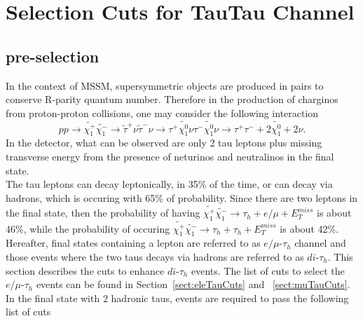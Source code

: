 \section{Selection Cuts for TauTau Channel}
\label{sect:tauTauCuts}
\subsection{pre-selection}
In the context of MSSM, supersymmetric objects are produced in pairs to conserve R-parity quantum number. Therefore in the production of charginos from proton-proton collisions, one may consider the following interaction $$pp\rightarrow\tilde{\chi_{1}^{+}}\tilde{\chi_{1}^{-}}\rightarrow\tilde{\tau}^{+}\nu \tilde{\tau}^{-}\nu\rightarrow\tau^{+}\tilde{\chi_{1}^{0}}\nu\tau^{-}\tilde{\chi_{1}^{0}}\nu\rightarrow\tau^{+}\tau^{-} + 2\tilde{\chi_{1}^{0}} + 2\nu.$$ In the detector, what can be observed are only 2 tau leptons plus missing transverse energy from the presence of neturinos and neutralinos in the final state.\\
The tau leptons can decay leptonically, in 35\% of the time, or can decay via hadrons, which is occuring with 65\% of probability. Since there are two leptons in the final state, then the probability of having $\tilde{\chi_{1}^{+}}\tilde{\chi_{1}^{-}} \rightarrow \tau_h+e/\mu+E_{T}^{miss}$ is about 46\%, while the probability of occuring $\tilde{\chi_{1}^{+}}\tilde{\chi_{1}^{-}} \rightarrow \tau_h+\tau_h+E_{T}^{miss}$ is about 42\%. Hereafter, final states containing a lepton are referred to as $e/\mu\text{-}\tau_h$ channel and those events where the two taus decays via hadrons are referred to as $di\text{-}\tau_h$. This section describes the cuts to enhance $di\text{-}\tau_h$ events. The list of cuts to select the $e/\mu\text{-}\tau_h$ events can be found in Section~\ref{sect:eleTauCuts} and ~\ref{sect:muTauCuts}.\\    
In the final state with 2 hadronic taus, events are required to pass the following list of cuts
